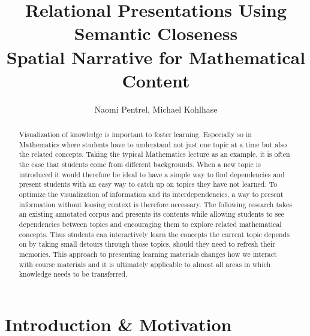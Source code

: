 \documentclass{llncs}
\title{Relational Presentations Using Semantic Closeness\\Spatial Narrative for
  Mathematical Content}
\author{Naomi Pentrel, Michael Kohlhase}
\institute{Jacobs University Bremen}
\begin{document}
\maketitle


\begin{abstract}
Visualization of knowledge is important to foster learning. Especially so in Mathematics where students have to understand not just one topic at a time but also the related concepts. Taking the typical Mathematics lecture as an example, it is often the case that students come from different backgrounds. When a new topic is introduced it would therefore be ideal to have a simple way to find dependencies and present students with an easy way to catch up on topics they have not learned. To optimize the visualization of information and its interdependencies, a way to present information without loosing context is therefore necessary. The following research takes an existing annotated corpus and presents its contents while allowing students to see dependencies between topics and encouraging them to explore related mathematical concepts. Thus students can interactively learn the concepts the current topic depends on by taking small detours through those topics, should they need to refresh their memories. This approach to presenting learning materials changes how we interact with course materials and it is ultimately applicable to almost all areas in which knowledge needs to be transferred.
\end{abstract}

\section{Introduction \& Motivation}
\label{sec:introduction}
\end{document}
